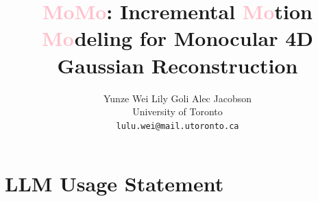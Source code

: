 \documentclass[10pt,twocolumn,letterpaper]{article}
\title{\textcolor{pink}{MoMo}: Incremental \textcolor{pink}{Mo}tion \textcolor{pink}{Mo}deling for Monocular 4D Gaussian Reconstruction}
\author{Yunze Wei \qquad Lily Goli \qquad Alec Jacobson\\
University of Toronto\\
{\tt\small lulu.wei@mail.utoronto.ca}
}
\begin{document}
\maketitle









\section*{LLM Usage Statement}
{
    
    
}


\end{document}
